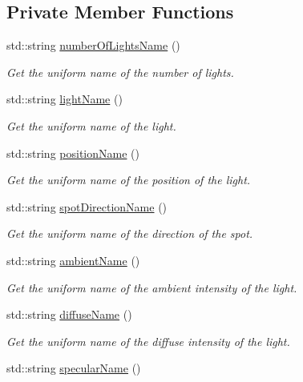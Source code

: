\subsection*{Private Member Functions}
\begin{DoxyCompactItemize}
\item 
std\+::string \hyperlink{classSpotLight_ae26bb39132ced26535799ec56642468a}{number\+Of\+Lights\+Name} ()
\begin{DoxyCompactList}\small\item\em Get the uniform name of the number of lights. \end{DoxyCompactList}\item 
std\+::string \hyperlink{classSpotLight_a4cbe9f9afcdf316cff2a840300196e25}{light\+Name} ()
\begin{DoxyCompactList}\small\item\em Get the uniform name of the light. \end{DoxyCompactList}\item 
std\+::string \hyperlink{classSpotLight_a1e3ef448e3022abe369db9ec4e83ab26}{position\+Name} ()
\begin{DoxyCompactList}\small\item\em Get the uniform name of the position of the light. \end{DoxyCompactList}\item 
std\+::string \hyperlink{classSpotLight_a72e18c47be1700bc41621d98dd0a69d5}{spot\+Direction\+Name} ()
\begin{DoxyCompactList}\small\item\em Get the uniform name of the direction of the spot. \end{DoxyCompactList}\item 
std\+::string \hyperlink{classSpotLight_ad649e5056280bd5264cd560c320cd3ad}{ambient\+Name} ()
\begin{DoxyCompactList}\small\item\em Get the uniform name of the ambient intensity of the light. \end{DoxyCompactList}\item 
std\+::string \hyperlink{classSpotLight_a74444439ad227bf44cfd63e88a6e0eaf}{diffuse\+Name} ()
\begin{DoxyCompactList}\small\item\em Get the uniform name of the diffuse intensity of the light. \end{DoxyCompactList}\item 
std\+::string \hyperlink{classSpotLight_aaf72c2c6a8abc7618be8ae712b67b4ab}{specular\+Name} ()

\end{DoxyCompactItemize}
